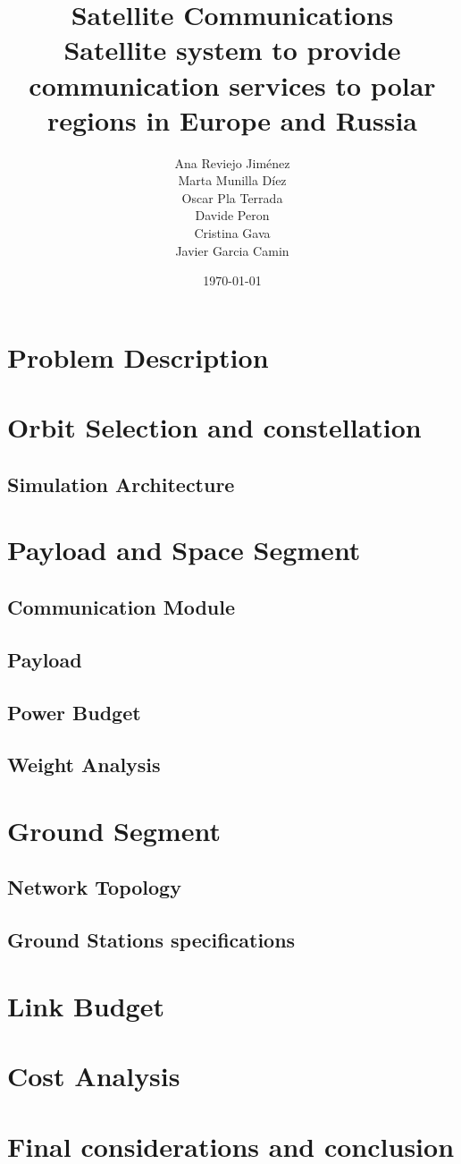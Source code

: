 \documentclass[11pt,a4paper,titlepage]{article}
\title{\blue Satellite Communications \\
\blueb Satellite system to provide communication services to polar regions in Europe and Russia}
\author{Ana Reviejo Jiménez \\ Marta Munilla Díez\\ Oscar Pla Terrada\\ Davide Peron\\ Cristina Gava\\ Javier Garcia Camin}
\date{\today}
\begin{document}
\maketitle

\tableofcontents
\clearpage

\section{Problem Description}
	

\section{Orbit Selection and constellation}
	\lipsum[1]
	\subsection{Simulation Architecture}
	\lipsum[2]

\section{Payload and Space Segment}
	\lipsum[1]
	\subsection{Communication Module}
	\lipsum[1]
	\subsection{Payload}
	
	\lipsum[1]
	\subsection{Power Budget}
	\lipsum[1]
	\subsection{Weight Analysis}
	\lipsum[1]

\section{Ground Segment}
	\lipsum[1]
	\subsection{Network Topology}
	\lipsum[1]
	\subsection{Ground Stations specifications}
	\lipsum[1]

\section{Link Budget}
\lipsum[1]

\section{Cost Analysis}
\lipsum[1]

\section{Final considerations and conclusion}
\lipsum[1]
\end{document}
